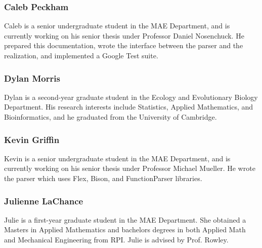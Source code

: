 \subsubsection*{Caleb Peckham}

Caleb is a senior undergraduate student in the M\+AE Department, and is currently working on his senior thesis under Professor Daniel Nosenchuck. He prepared this documentation, wrote the interface between the parser and the realization, and implemented a Google Test suite.

\subsubsection*{Dylan Morris}

Dylan is a second-\/year graduate student in the Ecology and Evolutionary Biology Department. His research interests include Statistics, Applied Mathematics, and Bioinformatics, and he graduated from the University of Cambridge.

\subsubsection*{Kevin Griffin}

Kevin is a senior undergraduate student in the M\+AE Department, and is currently working on his senior thesis under Professor Michael Mueller. He wrote the parser which uses Flex, Bison, and Function\+Parser libraries.

\subsubsection*{Julienne La\+Chance}

Julie is a first-\/year graduate student in the M\+AE Department. She obtained a Master\textquotesingle{}s in Applied Mathematics and bachelors degrees in both Applied Math and Mechanical Engineering from R\+PI. Julie is advised by Prof. Rowley. 